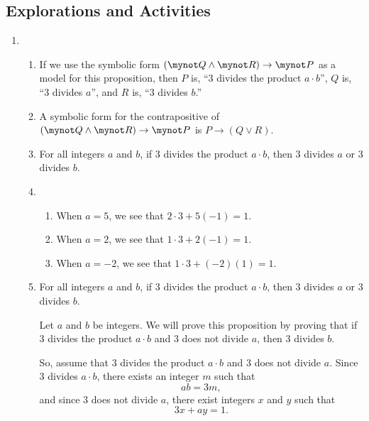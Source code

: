 \subsection*{Explorations and Activities}
\setcounter{oldenumi}{\theenumi}
\begin{enumerate} \setcounter{enumi}{\theoldenumi}
\item \begin{enumerate}
\item If we use the symbolic form  
$\left( {\mynot  Q \wedge \mynot  R} \right) \to \mynot  P$  as a model for this proposition, then  $P$  is, ``3 divides the product  $a \cdot b$'',  $Q$  is, ``3  divides  $a$'', and  $R$ is, 
``3 divides  $b$.''  

\item A  symbolic form for the contrapositive of   
$\left( {\mynot  Q \wedge \mynot  R} \right) \to \mynot  P$ is  $P \to \left( {Q \vee R} \right)$.

\item For all integers $a$  and  $b$, if  3  divides the product  $a \cdot b$, then  3  divides  $a$  or  3  divides  $b$.

\item \begin{enumerate}
  \item When  $a = 5$, we see that  $2 \cdot 3 + 5\left( { - 1} \right) = 1$.
  \item When  $a = 2$, we see that  $1 \cdot 3 + 2\left( { - 1} \right) = 1$.
  \item When $a =  - 2$, we see that  $1 \cdot 3 + \left( { - 2} \right)\left( 1 \right) = 1$.
\end{enumerate}

\item
For all integers $a$  and  $b$, if  3  divides the product  $a \cdot b$, then  3  divides  $a$  or  3  divides  $b$.

\begin{myproof}
Let  $a$  and  $b$  be integers.  We will prove this proposition by proving that if  3  divides the product  $a \cdot b$ and  3  does not divide  $a$, then  3  divides  $b$.

So, assume that   3  divides the product  $a \cdot b$  and  3  does not divide  $a$.  Since  3  divides  $a \cdot b$, there exists an integer  $m$  such that
\setcounter{equation}{0}
\begin{equation} \label{eq:act312a}
a b = 3m,
\end{equation}
%
and since  3  does not divide  $a$, there exist integers  $x$  and  $y$  such that
\begin{equation} \label{eq:act312b}
3x + ay = 1.
\end{equation}


\end{myproof}
\end{enumerate}
\end{enumerate}
